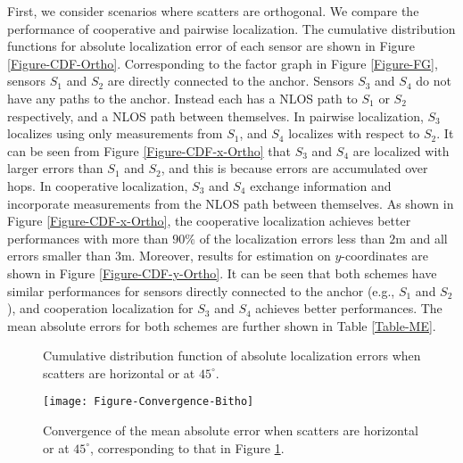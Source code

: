 \documentclass[10pt, twocolumn, final]{IEEEtran}
\begin{document}
First, we consider scenarios where scatters are orthogonal. We compare the performance of cooperative and pairwise localization. The cumulative distribution functions for absolute localization error of each sensor are shown in Figure \ref{Figure-CDF-Ortho}. Corresponding to the factor graph in Figure \ref{Figure-FG}, sensors $S_1$ and $S_2$ are directly connected to the anchor. Sensors $S_3$ and $S_4$ do not have any paths to the anchor. Instead each has a NLOS path to $S_1$ or $S_2$ respectively, and a NLOS path between themselves. In pairwise localization, $S_3$ localizes using only measurements from $S_1$, and $S_4$ localizes with respect to $S_2$. It can be seen from Figure \ref{Figure-CDF-x-Ortho} that $S_3$ and $S_4$ are localized with larger errors than $S_1$ and $S_2$, and this is because errors are accumulated over hops. In cooperative localization, $S_3$ and $S_4$ exchange information and incorporate measurements from the NLOS path between themselves. As shown in Figure \ref{Figure-CDF-x-Ortho}, the cooperative localization achieves better performances with more than $90\%$ of the localization errors less than $2 \mathrm{m}$ and all errors smaller than $3 \mathrm{m}$. Moreover, results for estimation on $y$-coordinates are shown in Figure \ref{Figure-CDF-y-Ortho}. It can be seen that both schemes have similar performances for sensors directly connected to the anchor (e.g., $S_1$ and $S_2$), and cooperation localization for $S_3$ and $S_4$ achieves better performances. The mean absolute errors for both schemes are further shown in Table \ref{Table-ME}.

\begin{figure}
  \centering
  \caption{Cumulative distribution function of absolute localization errors when scatters are horizontal or at $45^{\circ}$.} \label{Figure-CDF-Bitho}
\end{figure}

\begin{figure}[!t]
\centering
\texttt{[image: Figure-Convergence-Bitho]}
\caption{Convergence of the mean absolute error when scatters are horizontal or at $45^{\circ}$, corresponding to that in Figure \ref{Figure-CDF-Bitho}.} \label{Figure-Convergence}
\end{figure}
\end{document}
